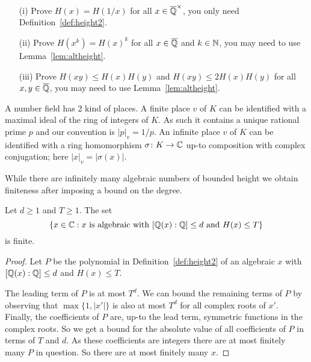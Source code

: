 \begin{exercise}
  \label{exer:heightprop}
  \begin{enumerate}
  \item[(i)] Prove $H(x)=H(1/x)$ for all $x\in{\overline{\mathbb{Q}}}^\times$, you only need
    Definition~\ref{def:height2}.
  \item[(ii)] Prove $H(x^k) = H(x)^k$ for all $x\in{\overline{\mathbb{Q}}}$ and $k\in{\mathbb{N}}$,
    you may need to use Lemma~\ref{lem:altheight}.
  \item[(iii)] Prove $H(xy) \le H(x)H(y)$ and
    $H(xy)\le 2H(x)H(y)$ for all $x,y\in{\overline{\mathbb{Q}}}$,
    you may need to use Lemma~\ref{lem:altheight}.
    
  \end{enumerate}
\end{exercise}

A number field has 2 kind of places. A finite place $v$ of $K$ can be
identified with a maximal ideal of the ring of integers of $K$. As
such it contains a unique rational prime $p$ and our convention is
$|p|_v=1/p$. An infinite place $v$ of $K$ can be identified with a
ring homomorphism $\sigma\colon K\rightarrow{\mathbb{C}}$ up-to composition
with complex conjugation; here $|x|_v=|\sigma(x)|$.


While  there are infinitely many algebraic numbers of
bounded height we obtain finiteness after imposing a bound on the
degree.

\begin{theorem}
  \label{thm:northcott}
  Let $d\ge 1$ and $T\ge 1$. The set
  \begin{equation*}
    \{x\in {\mathbb{C}} : x \text{ is algebraic with }[{\mathbb{Q}}(x):{\mathbb{Q}}]\le d\text{
      and }H(x)\le T\}
  \end{equation*}
  is finite. 
\end{theorem}
\begin{proof}
  Let $P$ be the polynomial in Definition~\ref{def:height2} of an
  algebraic $x$ with $[{\mathbb{Q}}(x):{\mathbb{Q}}]\le d$ and $H(x)\le T$.

  The leading term of $P$ is at most $T^d$. We can bound the remaining
  terms of $P$ by observing that $\max\{1,|x'|\}$
  is also at most $T^d$ for all complex roots of $x'$.
  Finally, the coefficients of $P$ are, up-to the lead term, symmetric
  functions in the complex roots. So we get a bound for the absolute
  value of all coefficients of $P$ in terms of $T$ and $d$. As these
  coefficients are integers there are at most finitely many $P$ in
  question. So there are at most finitely many $x$. 
\end{proof}


